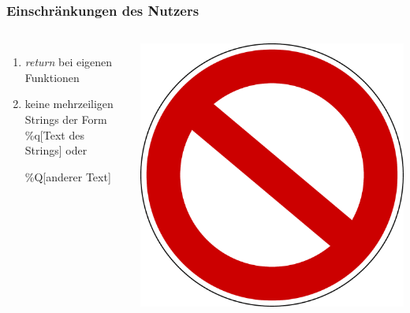 \begin{frame}
\frametitle{Einschränkungen des Nutzers}
  \begin{columns}
    \begin{enumerate}
    \item \textit{return} bei eigenen Funktionen
    \item keine mehrzeiligen Strings der Form             
    \%q[Text des Strings] oder 
    
    \%Q[anderer Text]
    \end{enumerate}
  \includegraphics[scale=0.15]{preprocessor/pics/Verbotsschild}
  \end{columns} 
\end{frame}
